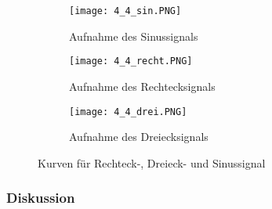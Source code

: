 \documentclass[12pt,a4paper]{article}
\begin{document}
\begin{figure}[H]
        \centering
        \begin{subfigure}[t]{0.28\textwidth}
                \texttt{[image: 4\_4\_sin.PNG]}
                \caption[Aufnahme des Sinussignals]{Aufnahme des Sinussignals}
                \label{fig:4_4_sin}
        \end{subfigure}%
        \hfill
        \begin{subfigure}[t]{0.28\textwidth}
                \texttt{[image: 4\_4\_recht.PNG]}
                \caption[Aufnahme des Rechtecksignals]{Aufnahme des Rechtecksignals}
                \label{fig:4_4_recht}
        \end{subfigure}
        \hfill
        \begin{subfigure}[t]{0.28\textwidth}
                \texttt{[image: 4\_4\_drei.PNG]}
                \caption[Aufnahme des Dreiecksignals]{Aufnahme des Dreiecksignals}
  				\label{fig:4_4_drei}
        \end{subfigure}
        \caption{Kurven  für Rechteck-, Dreieck- und Sinussignal}
        \label{fig:4_4}
\end{figure}

\subsubsection{Diskussion}
\end{document}
